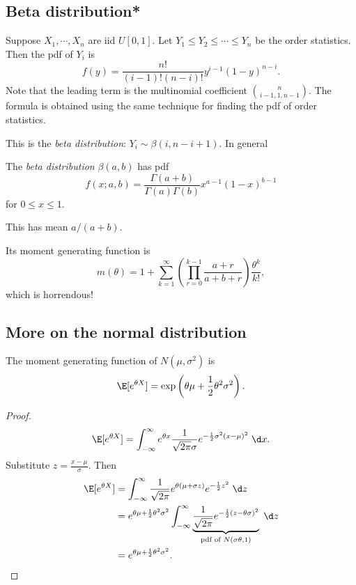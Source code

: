 \documentclass[a4paper]{article}
\begin{document}
\subsection{Beta distribution*}
Suppose $X_1, \cdots, X_n$ are iid $U[0, 1]$. Let $Y_1 \leq Y_2 \leq \cdots \leq Y_n$ be the order statistics. Then the pdf of $Y_i$ is
\[
  f(y) = \frac{n!}{(i - 1)!(n - i)!}y^{i - 1}(1 - y)^{n - i}.
\]
Note that the leading term is the multinomial coefficient $\binom{n}{i - 1, 1, n - 1}$. The formula is obtained using the same technique for finding the pdf of order statistics.

This is the \emph{beta distribution}: $Y_i \sim \beta(i, n - i + 1)$. In general
\begin{defi}
  The \emph{beta distribution} $\beta(a, b)$ has pdf
  \[
    f(x; a, b) = \frac{\Gamma(a + b)}{\Gamma(a)\Gamma(b)}x^{a - 1}(1 - x)^{b - 1}
  \]
  for $0 \leq x \leq 1$.

  This has mean $a/(a + b)$.
\end{defi}
Its moment generating function is
\[
  m(\theta) = 1 + \sum_{k = 1}^\infty \left(\prod_{r = 0}^{k - 1}\frac{a + r}{a + b + r}\right)\frac{\theta^k}{k!},
\]
which is horrendous!

\subsection{More on the normal distribution}
\begin{prop}
  The moment generating function of $N(\mu, \sigma^2)$ is
  \[
    \E[e^{\theta X}] = \exp\left(\theta\mu + \frac{1}{2}\theta^2 \sigma^2\right).
  \]
\end{prop}

\begin{proof}
 \[
  \E[e^{\theta X}] = \int_{-\infty}^\infty e^{\theta x} \frac{1}{\sqrt{2\pi} \sigma} e^{-\frac{1}{2}\sigma^2 (x - \mu)^2}\;\d x.
\]
Substitute $z = \frac{x - \mu}{\sigma}$. Then
\begin{align*}
  \E[e^{\theta X}] &= \int_{-\infty}^\infty \frac{1}{\sqrt{2\pi}}e^{\theta(\mu + \sigma z)} e^{-\frac{1}{2}z^2}\;\d z\\
  &= e^{\theta\mu + \frac{1}{2}\theta^2\sigma^2}\int_{-\infty}^\infty \underbrace{\frac{1}{\sqrt{2\pi}}e^{-\frac{1}{2}(z - \theta \sigma)^2}}_{\text{pdf of }N(\sigma\theta, 1)}\;\d z\\
  &= e^{\theta\mu + \frac{1}{2}\theta^2\sigma^2}.\qedhere
\end{align*}
\end{proof}
\end{document}
